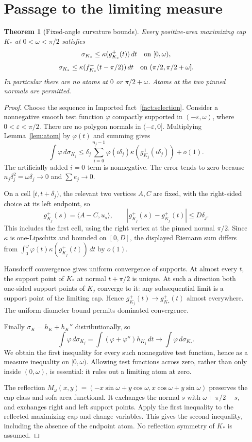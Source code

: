 \documentclass[11pt]{article}
\newtheorem{theorem}{Theorem}[section]
\newcommand{\ip}[2]{\langle #1,#2\rangle}
\begin{document}
\section{Passage to the limiting measure}
\begin{theorem}[Fixed-angle curvature bounds]\label{thm:curvature}
Every positive-area maximizing cap $K_*$ at $0<\omega<\pi/2$ satisfies
\[
 \sigma_{K_*}\le\kappa(g_{K_*}^+(t))\,dt\quad\hbox{on }[0,\omega),
\]
\[
 \sigma_{K_*}\le\kappa(f_{K_*}^-(t-\pi/2))\,dt
 \quad\hbox{on }(\pi/2,\pi/2+\omega].
\]
In particular there are no atoms at $0$ or $\pi/2+\omega$. Atoms at the two pinned normals are permitted.
\end{theorem}
\begin{proof}
Choose the sequence in Imported fact~\ref{fact:selection}. Consider a nonnegative smooth test function $\varphi$ compactly supported in $(-\varepsilon,\omega)$, where $0<\varepsilon<\pi/2$. There are no polygon normals in $(-\varepsilon,0]$. Multiplying Lemma~\ref{lem:atom} by $\varphi(t)$ and summing gives
\[
 \int\varphi\,d\sigma_{K_j}
 \le\delta_j\sum_{i=0}^{n_j-1}\varphi(i\delta_j)\kappa(g_{K_j}^+(i\delta_j))+o(1).
\]
The artificially added $i=0$ term is nonnegative. The error tends to zero because $n_j\delta_j^2=\omega\delta_j\to0$ and $\sum e_j\to0$.

On a cell $[t,t+\delta_j)$, the relevant two vertices $A,C$ are fixed, with the right-sided choice at its left endpoint, so
\[
 g_{K_j}^+(s)=\ip{A-C}{u_s},\qquad
 |g_{K_j}^+(s)-g_{K_j}^+(t)|\le D\delta_j.
\]
This includes the first cell, using the right vertex at the pinned normal $\pi/2$. Since $\kappa$ is one-Lipschitz and bounded on $[0,D]$, the displayed Riemann sum differs from $\int_0^\omega\varphi(t)\kappa(g_{K_j}^+(t))\,dt$ by $o(1)$.

Hausdorff convergence gives uniform convergence of supports. At almost every $t$, the support point of $K_*$ at normal $t+\pi/2$ is unique. At such a direction both one-sided support points of $K_j$ converge to it: any subsequential limit is a support point of the limiting cap. Hence $g_{K_j}^+(t)\to g_{K_*}^+(t)$ almost everywhere. The uniform diameter bound permits dominated convergence.

Finally $\sigma_K=h_K+h_K''$ distributionally, so
\[
 \int\varphi\,d\sigma_{K_j}=\int(\varphi+\varphi'')h_{K_j}\,dt
 \longrightarrow\int\varphi\,d\sigma_{K_*}.
\]
We obtain the first inequality for every such nonnegative test function, hence as a measure inequality on $[0,\omega)$. Allowing test functions across zero, rather than only inside $(0,\omega)$, is essential: it rules out a limiting atom at zero.

The reflection $M_\omega(x,y)=(-x\sin\omega+y\cos\omega,x\cos\omega+y\sin\omega)$ preserves the cap class and sofa-area functional. It exchanges the normal $s$ with $\omega+\pi/2-s$, and exchanges right and left support points. Apply the first inequality to the reflected maximizing cap and change variables. This gives the second inequality, including the absence of the endpoint atom. No reflection symmetry of $K_*$ is assumed.
\end{proof}
\end{document}
